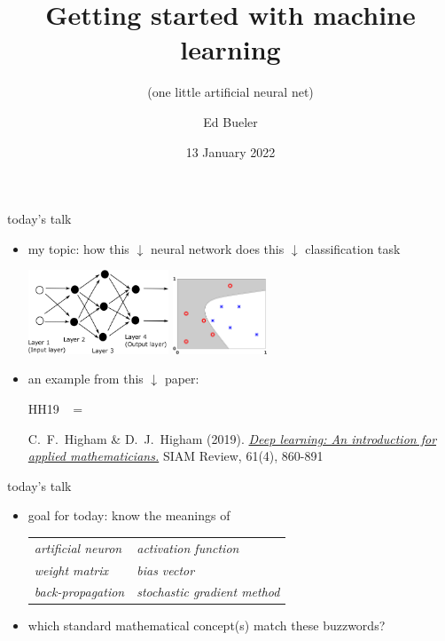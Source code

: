 \documentclass[xcolor={svgnames},
               hyperref={colorlinks,citecolor=DeepPink4,linkcolor=FireBrick,urlcolor=Maroon}]
               {beamer}
\title{Getting started with machine learning}
\subtitle{({one little artificial neural net})}
\author{Ed Bueler}
\institute[UAF]{MATH 692 Mathematics for Machine Learning \\ UAF}
\date[Spring 2022]{13 January 2022}
\begin{document}
\beamertemplatenavigationsymbolsempty

\begin{frame}
  \maketitle
\end{frame}

\begin{frame}{today's talk}

\begin{itemize}
\item \alert{my topic:} {\small how this $\downarrow$ neural network does this $\downarrow$ classification task}

\medskip
\hspace{5mm} \includegraphics[height=25mm]{figs/network.png} \hfill \includegraphics[height=23mm]{figs/classification} \hspace{10mm}

\medskip
\item an \alert{example} from this $\downarrow$ paper:

\medskip

HH19 \, $=$ \, 
\begin{minipage}[t]{0.75\textwidth} \footnotesize
C.~F.~Higham \& D.~J.~Higham (2019). \href{http://www.math.stonybrook.edu/~bishop/classes/math533.S21/MachineLearning/SIAMreview.pdf}{\emph{Deep learning: An introduction for applied mathematicians.}} SIAM Review, 61(4), 860-891
\end{minipage}
\end{itemize}
\end{frame}


\begin{frame}{today's talk}

\begin{itemize}
\item \alert{goal for today:} know the meanings of

\medskip
\small
\qquad \begin{tabular}{ll}
\emph{artificial neuron} \qquad & \emph{activation function} \\
\emph{weight matrix} & \emph{bias vector} \\
\emph{back-propagation} & \emph{stochastic gradient method}
\end{tabular}

\medskip
\item which standard mathematical concept(s) match these buzzwords?
\end{itemize}
\end{frame}
\end{document}
